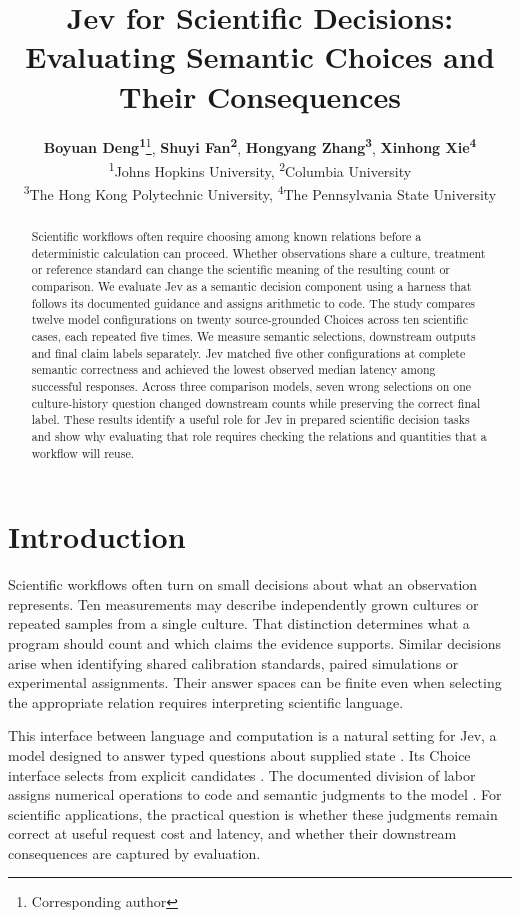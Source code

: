 \documentclass[11pt]{article}
\title{Jev for Scientific Decisions:\\Evaluating Semantic Choices and Their Consequences}
\author{
 \textbf{Boyuan Deng\textsuperscript{1}}\thanks{Corresponding author},
 \textbf{Shuyi Fan\textsuperscript{2}},
 \textbf{Hongyang Zhang\textsuperscript{3}},
 \textbf{Xinhong Xie\textsuperscript{4}}\\
 \textsuperscript{1}Johns Hopkins University, \textsuperscript{2}Columbia University\\
 \textsuperscript{3}The Hong Kong Polytechnic University, \textsuperscript{4}The Pennsylvania State University
}
\begin{document}
\maketitle

\begin{abstract}
    Scientific workflows often require choosing among known relations before a deterministic calculation can proceed. Whether observations share a culture, treatment or reference standard can change the scientific meaning of the resulting count or comparison. We evaluate Jev as a semantic decision component using a harness that follows its documented guidance and assigns arithmetic to code. The study compares twelve model configurations on twenty source-grounded Choices across ten scientific cases, each repeated five times. We measure semantic selections, downstream outputs and final claim labels separately. Jev matched five other configurations at complete semantic correctness and achieved the lowest observed median latency among successful responses. Across three comparison models, seven wrong selections on one culture-history question changed downstream counts while preserving the correct final label. These results identify a useful role for Jev in prepared scientific decision tasks and show why evaluating that role requires checking the relations and quantities that a workflow will reuse.
\end{abstract}

\section{Introduction}
\label{sec:introduction}

Scientific workflows often turn on small decisions about what an observation represents. Ten measurements may describe independently grown cultures or repeated samples from a single culture. That distinction determines what a program should count and which claims the evidence supports. Similar decisions arise when identifying shared calibration standards, paired simulations or experimental assignments. Their answer spaces can be finite even when selecting the appropriate relation requires interpreting scientific language.

This interface between language and computation is a natural setting for Jev, a model designed to answer typed questions about supplied state \citep{typesafe2026introduction}. Its Choice interface selects from explicit candidates \citep{typesafe2026choice}. The documented division of labor assigns numerical operations to code and semantic judgments to the model \citep{typesafe2026jaggedness}. For scientific applications, the practical question is whether these judgments remain correct at useful request cost and latency, and whether their downstream consequences are captured by evaluation.
\end{document}
